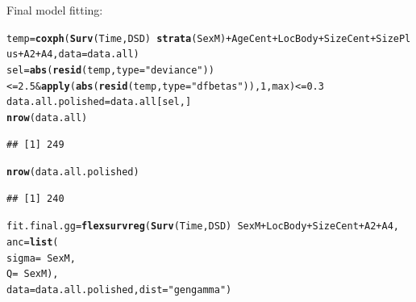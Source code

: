 \documentclass{article}\usepackage[]{graphicx}\usepackage[]{color}
\makeatletter
\newcommand{\hlnum}[1]{\textcolor[rgb]{0.686,0.059,0.569}{#1}}%
\newcommand{\hlstr}[1]{\textcolor[rgb]{0.192,0.494,0.8}{#1}}%
\newcommand{\hlopt}[1]{\textcolor[rgb]{0,0,0}{#1}}%
\newcommand{\hlstd}[1]{\textcolor[rgb]{0.345,0.345,0.345}{#1}}%
\newcommand{\hlkwb}[1]{\textcolor[rgb]{0.69,0.353,0.396}{#1}}%
\newcommand{\hlkwc}[1]{\textcolor[rgb]{0.333,0.667,0.333}{#1}}%
\newcommand{\hlkwd}[1]{\textcolor[rgb]{0.737,0.353,0.396}{\textbf{#1}}}%
\newenvironment{kframe}{%
 \def\at@end@of@kframe{}%
 \ifinner\ifhmode%
  \def\at@end@of@kframe{\end{minipage}}%
  \begin{minipage}{\columnwidth}%
 \fi\fi%
 \def\FrameCommand##1{\hskip\@totalleftmargin \hskip-\fboxsep
 \colorbox{shadecolor}{##1}\hskip-\fboxsep
     \hskip-\linewidth \hskip-\@totalleftmargin \hskip\columnwidth}%
 \MakeFramed {\advance\hsize-\width
   \@totalleftmargin\z@ \linewidth\hsize
   \@setminipage}}%
 {\par\unskip\endMakeFramed%
 \at@end@of@kframe}
\newenvironment{knitrout}{}{} %
\makeatother
\begin{document}
Final model fitting:
\begin{knitrout}
\color{fgcolor}\begin{kframe}
\begin{alltt}
\hlstd{temp} \hlkwb{=} \hlkwd{coxph}\hlstd{(}\hlkwd{Surv}\hlstd{(Time, DSD)} \hlopt{~} \hlkwd{strata}\hlstd{(SexM)} \hlopt{+} \hlstd{AgeCent} \hlopt{+} \hlstd{LocBody} \hlopt{+} \hlstd{SizeCent} \hlopt{+} \hlstd{SizePlus} \hlopt{+} \hlstd{A2} \hlopt{+} \hlstd{A4,} \hlkwc{data} \hlstd{= data.all)}
\hlstd{sel} \hlkwb{=} \hlkwd{abs}\hlstd{(}\hlkwd{resid}\hlstd{(temp,} \hlkwc{type} \hlstd{=} \hlstr{"deviance"}\hlstd{))} \hlopt{<=} \hlnum{2.5} \hlopt{&} \hlkwd{apply}\hlstd{(}\hlkwd{abs}\hlstd{(}\hlkwd{resid}\hlstd{(temp,} \hlkwc{type} \hlstd{=} \hlstr{"dfbetas"}\hlstd{)),} \hlnum{1}\hlstd{, max)} \hlopt{<=} \hlnum{0.3}
\hlstd{data.all.polished} \hlkwb{=} \hlstd{data.all[sel,]}
\hlkwd{nrow}\hlstd{(data.all)}
\end{alltt}
\begin{verbatim}
## [1] 249
\end{verbatim}
\begin{alltt}
\hlkwd{nrow}\hlstd{(data.all.polished)}
\end{alltt}
\begin{verbatim}
## [1] 240
\end{verbatim}
\begin{alltt}
\hlstd{fit.final.gg} \hlkwb{=} \hlkwd{flexsurvreg}\hlstd{(}\hlkwd{Surv}\hlstd{(Time, DSD)} \hlopt{~} \hlstd{SexM} \hlopt{+} \hlstd{LocBody} \hlopt{+} \hlstd{SizeCent} \hlopt{+} \hlstd{A2} \hlopt{+} \hlstd{A4,}
        \hlkwc{anc} \hlstd{=} \hlkwd{list}\hlstd{(}
                \hlkwc{sigma} \hlstd{=} \hlopt{~} \hlstd{SexM,}
                \hlkwc{Q} \hlstd{=} \hlopt{~} \hlstd{SexM),}
        \hlkwc{data} \hlstd{= data.all.polished,} \hlkwc{dist} \hlstd{=} \hlstr{"gengamma"}\hlstd{)}


\end{alltt}
\end{kframe}
\end{knitrout}
\end{document}
